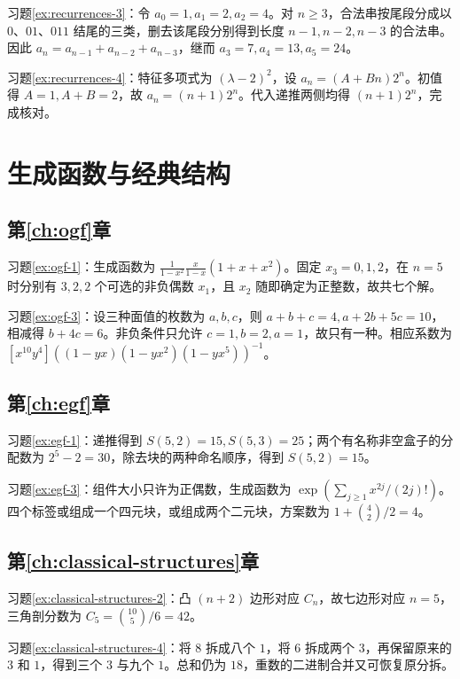 \documentclass[UTF8,12pt,a4paper,fontset=fandol]{ctexbook}
\begin{document}
习题\ref{ex:recurrences-3}：令 $a_0=1,a_1=2,a_2=4$。对 $n\ge3$，合法串按尾段分成以 $0$、$01$、$011$ 结尾的三类，删去该尾段分别得到长度 $n-1,n-2,n-3$ 的合法串。因此 $a_n=a_{n-1}+a_{n-2}+a_{n-3}$，继而 $a_3=7,a_4=13,a_5=24$。

习题\ref{ex:recurrences-4}：特征多项式为 $(\lambda-2)^2$，设 $a_n=(A+Bn)2^n$。初值得 $A=1,A+B=2$，故 $a_n=(n+1)2^n$。代入递推两侧均得 $(n+1)2^n$，完成核对。

\section{生成函数与经典结构}

\subsection{第\ref{ch:ogf}章}

习题\ref{ex:ogf-1}：生成函数为 $\frac1{1-x^2}\frac{x}{1-x}(1+x+x^2)$。固定 $x_3=0,1,2$，在 $n=5$ 时分别有 $3,2,2$ 个可选的非负偶数 $x_1$，且 $x_2$ 随即确定为正整数，故共七个解。

习题\ref{ex:ogf-3}：设三种面值的枚数为 $a,b,c$，则 $a+b+c=4,a+2b+5c=10$，相减得 $b+4c=6$。非负条件只允许 $c=1,b=2,a=1$，故只有一种。相应系数为 $[x^{10}y^4]((1-yx)(1-yx^2)(1-yx^5))^{-1}$。

\subsection{第\ref{ch:egf}章}

习题\ref{ex:egf-1}：递推得到 $S(5,2)=15,S(5,3)=25$；两个有名称非空盒子的分配数为 $2^5-2=30$，除去块的两种命名顺序，得到 $S(5,2)=15$。

习题\ref{ex:egf-3}：组件大小只许为正偶数，生成函数为 $\exp(\sum_{j\ge1}x^{2j}/(2j)!)$。四个标签或组成一个四元块，或组成两个二元块，方案数为 $1+\binom42/2=4$。

\subsection{第\ref{ch:classical-structures}章}

习题\ref{ex:classical-structures-2}：凸 $(n+2)$ 边形对应 $C_n$，故七边形对应 $n=5$，三角剖分数为 $C_5=\binom{10}{5}/6=42$。

习题\ref{ex:classical-structures-4}：将 $8$ 拆成八个 $1$，将 $6$ 拆成两个 $3$，再保留原来的 $3$ 和 $1$，得到三个 $3$ 与九个 $1$。总和仍为 $18$，重数的二进制合并又可恢复原分拆。
\end{document}
